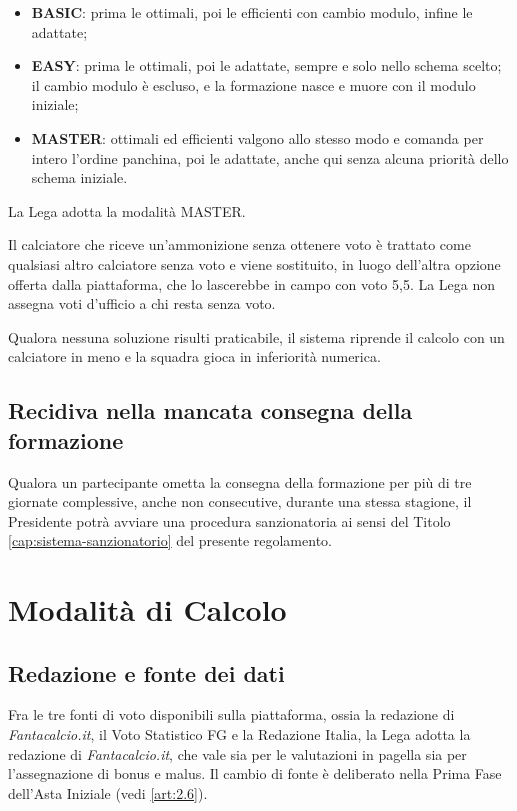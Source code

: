 \begin{itemize}
\item \textbf{BASIC}: prima le ottimali, poi le efficienti con cambio modulo, infine le adattate;
\item \textbf{EASY}: prima le ottimali, poi le adattate, sempre e solo nello schema scelto; il cambio modulo è escluso, e la formazione nasce e muore con il modulo iniziale;
\item \textbf{MASTER}: ottimali ed efficienti valgono allo stesso modo e comanda per intero l'ordine panchina, poi le adattate, anche qui senza alcuna priorità dello schema iniziale.
\end{itemize}

La Lega adotta la modalità MASTER.

Il calciatore che riceve un'ammonizione senza ottenere voto è trattato come qualsiasi altro calciatore senza voto e viene sostituito, in luogo dell'altra opzione offerta dalla piattaforma, che lo lascerebbe in campo con voto 5,5. La Lega non assegna voti d'ufficio a chi resta senza voto.

Qualora nessuna soluzione risulti praticabile, il sistema riprende il calcolo con un calciatore in meno e la squadra gioca in inferiorità numerica.

\section{Recidiva nella mancata consegna della formazione}
\label{art:4.6}

Qualora un partecipante ometta la consegna della formazione per più di tre giornate complessive, anche non consecutive, durante una stessa stagione, il Presidente potrà avviare una procedura sanzionatoria ai sensi del Titolo \ref{cap:sistema-sanzionatorio} del presente regolamento.


\chapter{Modalità di Calcolo}
\label{cap:modalita-calcolo}

\section{Redazione e fonte dei dati}
\label{art:5.1}

Fra le tre fonti di voto disponibili sulla piattaforma, ossia la redazione di \emph{Fantacalcio.it}, il Voto Statistico FG e la Redazione Italia, la Lega adotta la redazione di \emph{Fantacalcio.it}, che vale sia per le valutazioni in pagella sia per l'assegnazione di bonus e malus. Il cambio di fonte è deliberato nella Prima Fase dell'Asta Iniziale (vedi \ref{art:2.6}).

